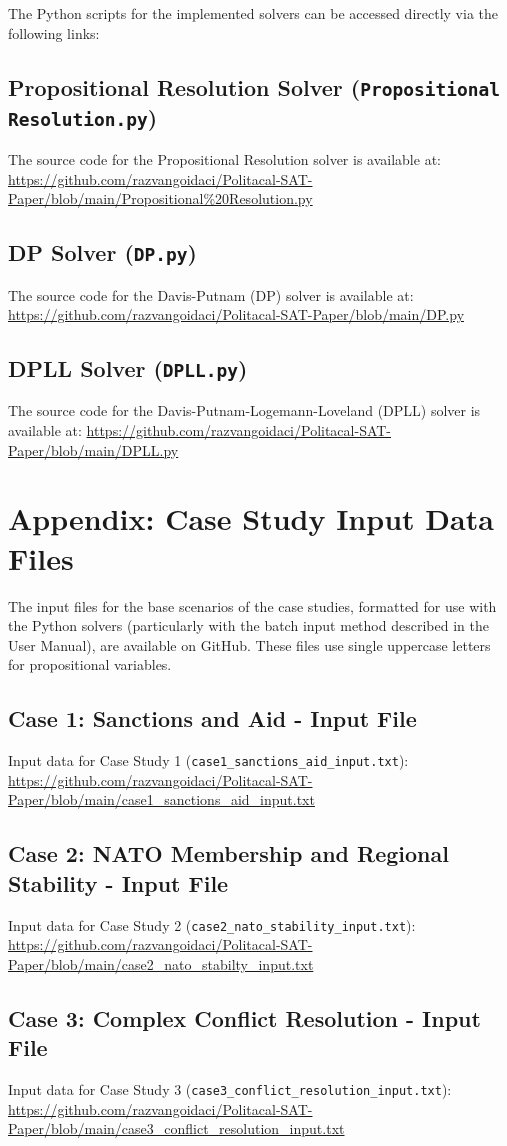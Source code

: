 \documentclass[11pt, a4paper]{article}
\begin{document}
The Python scripts for the implemented solvers can be accessed directly via the following links:

\subsection{Propositional Resolution Solver (\texttt{Propositional Resolution.py})} \label{app:resolution_code_link}
The source code for the Propositional Resolution solver is available at:
\url{https://github.com/razvangoidaci/Politacal-SAT-Paper/blob/main/Propositional%20Resolution.py}

\subsection{DP Solver (\texttt{DP.py})} \label{app:dp_code_link}
The source code for the Davis-Putnam (DP) solver is available at:
\url{https://github.com/razvangoidaci/Politacal-SAT-Paper/blob/main/DP.py}

\subsection{DPLL Solver (\texttt{DPLL.py})} \label{app:dpll_code_link}
The source code for the Davis-Putnam-Logemann-Loveland (DPLL) solver is available at:
\url{https://github.com/razvangoidaci/Politacal-SAT-Paper/blob/main/DPLL.py}

\section{Appendix: Case Study Input Data Files} \label{app:input_data}
The input files for the base scenarios of the case studies, formatted for use with the Python solvers (particularly with the batch input method described in the User Manual), are available on GitHub. These files use single uppercase letters for propositional variables.

\subsection{Case 1: Sanctions and Aid - Input File} \label{app:case1_input_link}
Input data for Case Study 1 (\texttt{case1\_sanctions\_aid\_input.txt}):
\url{https://github.com/razvangoidaci/Politacal-SAT-Paper/blob/main/case1_sanctions_aid_input.txt}

\subsection{Case 2: NATO Membership and Regional Stability - Input File} \label{app:case2_input_link}
Input data for Case Study 2 (\texttt{case2\_nato\_stability\_input.txt}):
\url{https://github.com/razvangoidaci/Politacal-SAT-Paper/blob/main/case2_nato_stabilty_input.txt}

\subsection{Case 3: Complex Conflict Resolution - Input File} \label{app:case3_input_link}
Input data for Case Study 3 (\texttt{case3\_conflict\_resolution\_input.txt}):
\url{https://github.com/razvangoidaci/Politacal-SAT-Paper/blob/main/case3_conflict_resolution_input.txt}


\end{document}

